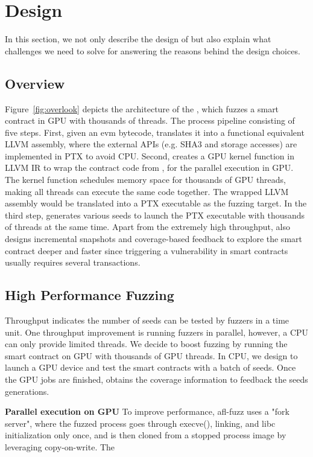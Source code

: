 \section{Design}
In this section, we not only describe the design of  {\tool} but also explain what challenges we need to solve for answering the reasons behind the design choices.  

\subsection{Overview}
Figure~\ref{fig:overlook} depicts the architecture of the {\tool}, which fuzzes a smart contract in GPU with thousands of threads. 
%
The process pipeline consisting of five steps. 
%
First, given an evm bytecode, {\translator} translates it into a functional equivalent LLVM assembly, where the external APIs (e.g. SHA3 and storage accesses) are implemented in PTX to avoid CPU.
%
Second, {\wrapper} creates a GPU kernel function in LLVM IR to wrap the contract code from {\translator}, for the parallel execution in GPU. The kernel function schedules memory space for thousands of GPU threads, making all threads can execute the same code together. The wrapped LLVM assembly would be translated into a PTX executable as the fuzzing target. 
%
In the third step, {\runner} generates various seeds to launch the PTX executable with thousands of threads at the same time. Apart from the extremely high throughput, {\runner} also designs incremental snapshots and coverage-based feedback to explore the smart contract deeper and faster since triggering a vulnerability in smart contracts usually requires several transactions\cite{}. 

\subsection{High Performance Fuzzing}

Throughput indicates the number of seeds can be tested by fuzzers in a time unit. 
One throughput improvement is running fuzzers in parallel, however, a CPU can only provide limited threads.
%
We decide to boost fuzzing by running the smart contract on GPU with thousands of GPU threads. 
In CPU, we design {\runner} to launch a GPU device and test the smart contracts with a batch of seeds. Once the GPU jobs are finished, {\runner} obtains the coverage information to feedback the seeds generations. 


\noindent \textbf{Parallel execution on GPU}
To improve performance, afl-fuzz uses a "fork server", where the fuzzed process goes through execve(), linking, and libc initialization only once, and is then cloned from a stopped process image by leveraging copy-on-write. The
\cite{cudaoverhead}

